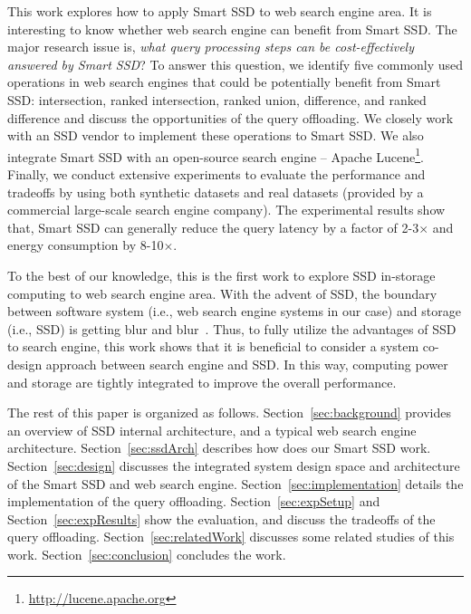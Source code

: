 This work explores how to apply Smart SSD to web search engine area. It is interesting to know whether web search engine can benefit from Smart SSD. The major research issue is, \emph{what query processing steps can be cost-effectively answered by Smart SSD}?
To answer this question, we identify five commonly used operations in web search engines that could be potentially benefit from Smart SSD: \textsf{intersection}, \textsf{ranked intersection}, \textsf{ranked union}, \textsf{difference}, and \textsf{ranked difference} and discuss the opportunities of the query offloading. We closely work with an SSD vendor to implement these operations to Smart SSD. We also integrate Smart SSD with an open-source search engine -- Apache Lucene\footnote{\url{http://lucene.apache.org}}. Finally, we conduct extensive experiments to evaluate the performance and tradeoffs by using both synthetic datasets and real datasets (provided by a commercial large-scale search engine company). The experimental results show that, Smart SSD can generally reduce the query latency by a factor of 2-3$\times$ and energy consumption by 8-10$\times$.

To the best of our knowledge, this is the first work to explore SSD in-storage computing to web search engine area. With the advent of SSD, the boundary between software system (i.e., web search engine systems in our case) and storage (i.e., SSD) is getting blur and blur~\cite{Steve12}. Thus, to fully utilize the advantages of SSD to search engine, this work shows that it is beneficial to consider a system co-design approach between search engine and SSD. In this way, computing power and storage are tightly integrated to improve the overall performance.

The rest of this paper is organized as follows.
Section~\ref{sec:background} provides an overview of SSD internal architecture, and a typical web search engine architecture.
Section~\ref{sec:ssdArch} describes how does our Smart SSD work.
Section~\ref{sec:design} discusses the integrated system design space and architecture of the Smart SSD and web search engine.
Section~\ref{sec:implementation} details the implementation of the query offloading.
Section~\ref{sec:expSetup} and Section~\ref{sec:expResults} show the evaluation, and discuss the tradeoffs of the query offloading.
Section~\ref{sec:relatedWork} discusses some related studies of this work.
Section~\ref{sec:conclusion} concludes the work.

